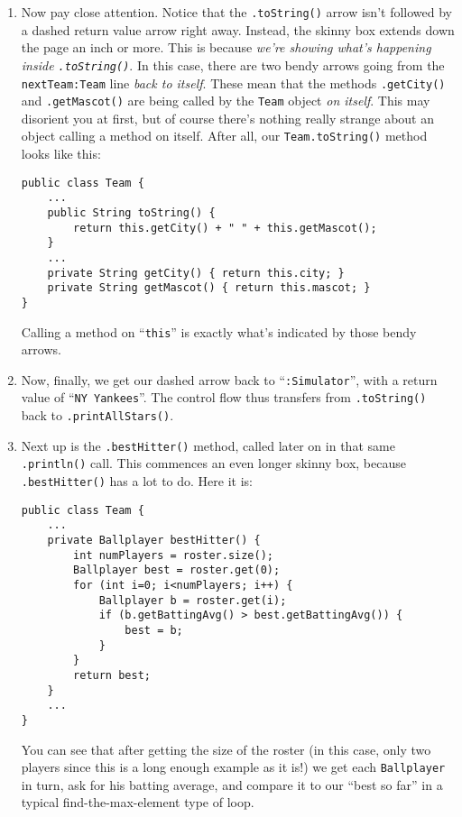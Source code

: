 \begin{enumerate}
\item Now pay close attention. Notice that the \texttt{.toString()} arrow
isn't followed by a dashed return value arrow right away. Instead, the skinny
box extends down the page an inch or more. This is because \textit{we're
showing what's happening inside \texttt{.toString()}}. In this case, there are
two bendy arrows going from the \texttt{nextTeam:Team} line \textit{back to
itself}. These mean that the methods \texttt{.getCity()} and
\texttt{.getMascot()} are being called by the \texttt{Team} object \textit{on
itself}. This may disorient you at first, but of course there's nothing really
strange about an object calling a method on itself. After all, our
\texttt{Team.toString()} method looks like this:

\begin{Verbatim}[fontsize=\footnotesize,samepage=true,frame=single]
public class Team {
    ...
    public String toString() {
        return this.getCity() + " " + this.getMascot();
    }
    ...
    private String getCity() { return this.city; }
    private String getMascot() { return this.mascot; }
}
\end{Verbatim}

Calling a method on ``\texttt{this}'' is exactly what's indicated by those
bendy arrows.

\item Now, finally, we get our dashed arrow back to ``\texttt{:Simulator}'',
with a return value of ``\texttt{NY Yankees}''. The control flow thus transfers
from \texttt{.toString()} back to \texttt{.printAllStars()}.

\item Next up is the \texttt{.bestHitter()} method, called later on in that
same \texttt{.println()} call. This commences an even longer skinny box,
because \texttt{.bestHitter()} has a lot to do. Here it is:

\begin{Verbatim}[fontsize=\scriptsize,samepage=true,frame=single]
public class Team {
    ...
    private Ballplayer bestHitter() {
        int numPlayers = roster.size();
        Ballplayer best = roster.get(0);
        for (int i=0; i<numPlayers; i++) {
            Ballplayer b = roster.get(i);
            if (b.getBattingAvg() > best.getBattingAvg()) {
                best = b;
            }
        }
        return best;
    }
    ...
}
\end{Verbatim}

You can see that after getting the size of the roster (in this case, only two
players since this is a long enough example as it is!) we get each
\texttt{Ballplayer} in turn, ask for his batting average, and compare it to
our ``best so far'' in a typical find-the-max-element type of loop.


\end{enumerate}
